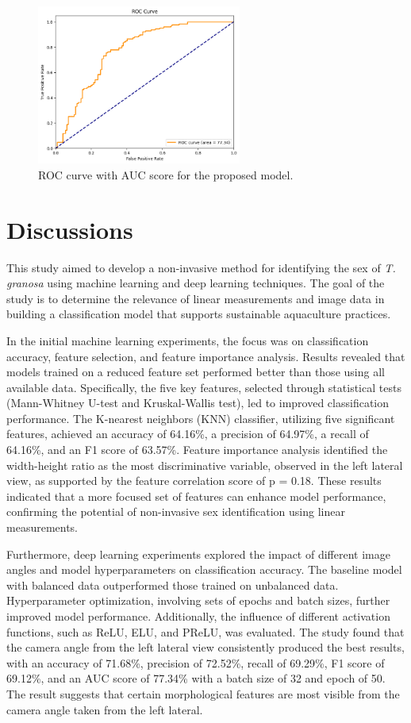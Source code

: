 \begin{figure}[!htbp]
	\centering
	\includegraphics[width=0.6\textwidth]{figures/roc.png}
	\caption{ROC curve with AUC score for the proposed model.}
	\label{fig:roc_auc}
\end{figure}

\newpage

\section{Discussions}
This study aimed to develop a non-invasive method for identifying the sex of \textit{T. granosa} using machine learning and deep learning techniques. The goal of the study is to determine the relevance of linear measurements and image data in building a classification model that supports sustainable aquaculture practices.

In the initial machine learning experiments, the focus was on classification accuracy, feature selection, and feature importance analysis. Results revealed that models trained on a reduced feature set performed better than those using all available data. Specifically, the five key features, selected through statistical tests (Mann-Whitney U-test and Kruskal-Wallis test), led to improved classification performance. The K-nearest neighbors (KNN) classifier, utilizing five significant features, achieved an accuracy of 64.16\%, a precision of 64.97\%, a recall of 64.16\%, and an F1 score of 63.57\%. Feature importance analysis identified the width-height ratio as the most discriminative variable, observed in the left lateral view, as supported by the feature correlation score of p = 0.18. These results indicated that a more focused set of features can enhance model performance, confirming the potential of non-invasive sex identification using linear measurements.

Furthermore, deep learning experiments explored the impact of different image angles and model hyperparameters on classification accuracy. The baseline model with balanced data outperformed those trained on unbalanced data. Hyperparameter optimization, involving sets of epochs and batch sizes, further improved model performance. Additionally, the influence of different activation functions, such as ReLU, ELU, and PReLU, was evaluated. The study found that the camera angle from the left lateral view consistently produced the best results, with an accuracy of 71.68\%, precision of 72.52\%, recall of 69.29\%, F1 score of 69.12\%, and an AUC score of 77.34\% with a batch size of 32 and epoch of 50. The result suggests that certain morphological features are most visible from the camera angle taken from the left lateral.

